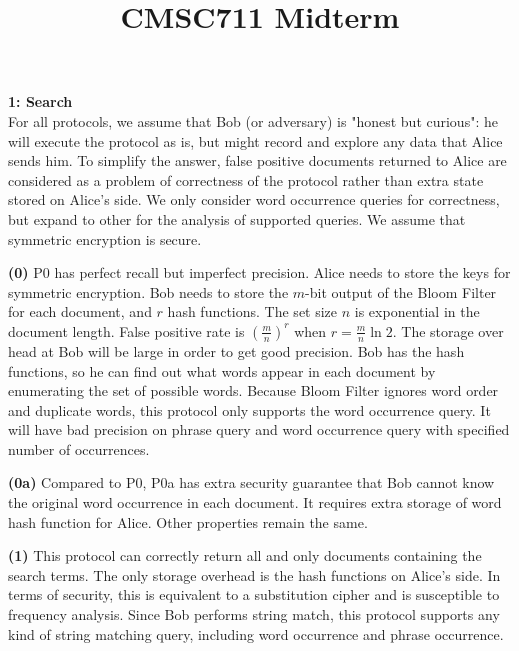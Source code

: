 \documentclass[10pt]{article}
\title{CMSC711 Midterm}
\newcommand\question[2]{\vspace{.1in}\textbf{#1: #2}\vspace{.5em}\vspace{.10in}}
\renewcommand\part[1]{\vspace{.10in}\textbf{(#1)}}
\begin{document}
\raggedright
\newcommand\NAME{Shi Feng}

\question{1}{Search} \\
For all protocols, we assume that Bob (or adversary) is "honest but curious": he
will execute the protocol as is, but might record and explore any data that
Alice sends him. To simplify the answer, false positive documents returned to
Alice are considered as a problem of correctness of the protocol rather than extra
state stored on Alice's side. We only consider word occurrence queries for
correctness, but expand to other for the analysis of supported queries. We
assume that symmetric encryption is secure.

\part{0}
P0 has perfect recall but imperfect precision.
Alice needs to store the keys for symmetric encryption. Bob needs to store the
$m$-bit output of the Bloom Filter for each document, and $r$ hash functions.
The set size $n$ is exponential in the document length.  False positive rate is
$(\frac{m}{n})^r$ when $r=\frac{m}{n}\ln 2$. The storage over head at Bob will
be large in order to get good precision.
Bob has the hash functions, so he can find out what words appear
in each document by enumerating the set of possible words. Because Bloom Filter
ignores word order and duplicate words, this protocol only supports the word
occurrence query. It will have bad precision on phrase query and word occurrence
query with specified number of occurrences.

\part{0a}
Compared to P0, P0a has extra security guarantee that Bob cannot know the
original word occurrence in each document.
It requires extra storage of word hash function for Alice.
Other properties remain the same.

\part{1}
This protocol can correctly return all and only documents containing the search
terms. 
The only storage overhead is the hash functions on Alice's side. 
In terms of security, this is equivalent to a substitution cipher and is
susceptible to frequency analysis.
Since Bob performs string match, this protocol supports any kind of string
matching query, including word occurrence and phrase occurrence.
\end{document}
